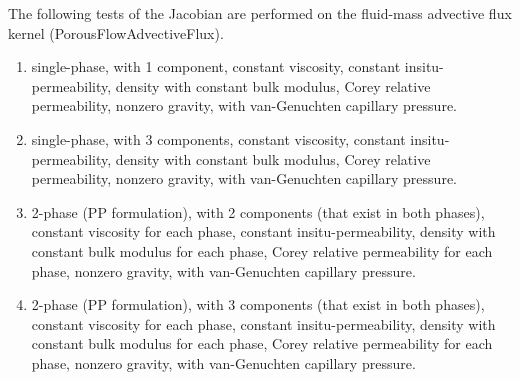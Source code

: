 \documentclass[]{scrreprt}
\begin{document}
The following tests of the Jacobian are performed on the fluid-mass advective flux kernel (PorousFlowAdvectiveFlux).
\begin{enumerate}
\item single-phase, with 1 component, constant viscosity, constant insitu-permeability, density with constant bulk modulus, Corey relative permeability, nonzero gravity, with van-Genuchten capillary pressure.
\item single-phase, with 3 components, constant viscosity, constant insitu-permeability, density with constant bulk modulus, Corey relative permeability, nonzero gravity, with van-Genuchten capillary pressure.
\item 2-phase (PP formulation), with 2 components (that exist in both phases), constant viscosity for each phase, constant insitu-permeability, density with constant bulk modulus for each phase, Corey relative permeability for each phase, nonzero gravity, with van-Genuchten capillary pressure.
\item 2-phase (PP formulation), with 3 components (that exist in both phases), constant viscosity for each phase, constant insitu-permeability, density with constant bulk modulus for each phase, Corey relative permeability for each phase, nonzero gravity, with van-Genuchten capillary pressure.
\end{enumerate}
\end{document}
